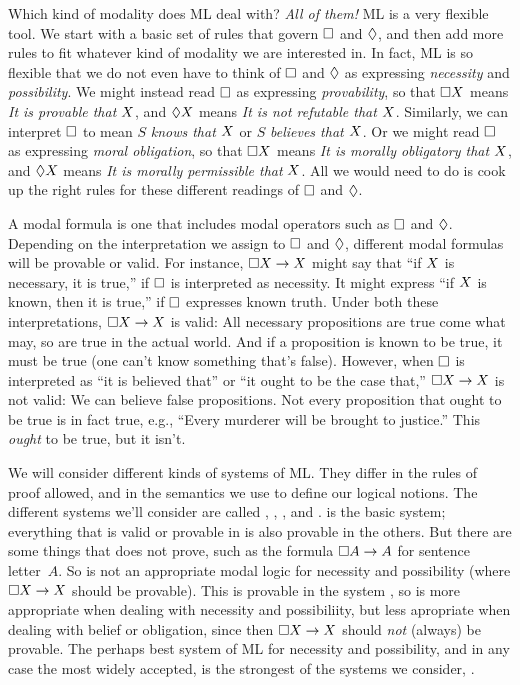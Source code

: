 Which kind of modality does ML deal with? \emph{All of them!} ML is a very flexible tool. We start with a basic set of rules that govern $\Box$ and $\Diamond$, and then add more rules to fit whatever kind of modality we are interested in. In fact, ML is so flexible that we do not even have to think of $\Box$ and $\Diamond$ as expressing \emph{necessity} and \emph{possibility}. We might instead read $\Box$ as expressing \emph{provability}, so that $\Box X$ means \emph{It is provable that} $X$, and $\Diamond X$ means \emph{It is not refutable that} $X$. Similarly, we can interpret $\Box$ to mean $S$ \emph{knows that $X$} or $S$ \emph{believes that $X$}. Or we might read $\Box$ as expressing \emph{moral obligation}, so that $\Box X$ means \emph{It is morally obligatory that} $X$, and $\Diamond X$ means \emph{It is morally permissible that} $X$. All we would need to do is cook up the right rules for these different readings of $\Box$ and $\Diamond$.

A modal formula is one that includes modal operators such as $\Box$ and $\Diamond$. Depending on the interpretation we assign to $\Box$ and $\Diamond$, different modal formulas will be provable or valid. For instance, $\Box X \rightarrow X$ might say that ``if $X$ is necessary, it is true,'' if $\Box$ is interpreted as necessity. It might express ``if $X$ is known, then it is true,'' if $\Box$ expresses known truth. Under both these interpretations, $\Box X \rightarrow X$ is valid: All necessary propositions are true come what may, so are true in the actual world. And if a proposition is known to be true, it must be true (one can't know something that's false). However, when $\Box$ is interpreted as ``it is believed that'' or ``it ought to be the case that,'' $\Box X \rightarrow X$ is not valid: We can believe false propositions. Not every proposition that ought to be true is in fact true, e.g., ``Every murderer will be brought to justice.'' This \emph{ought} to be true, but it isn't.

We will consider different kinds of systems of ML. They differ in the rules of proof allowed, and in the semantics we use to define our logical notions. The different systems we'll consider are called \mlK, \mlT, \mlSfour, and \mlSfive. \mlK{} is the basic system; everything that is valid or provable in \mlK{} is also provable in the others. But there are some things that \mlK{} does not prove, such as the formula $\Box A \rightarrow A$ for sentence letter~$A$. So \mlK{} is not an appropriate modal logic for necessity and possibility (where $\Box X \rightarrow X$ should be provable). This is provable in the system \mlT, so \mlT{} is more appropriate when dealing with necessity and possibiliity, but less apropriate when dealing with belief or obligation, since then $\Box X \rightarrow X$ should \emph{not} (always) be provable. The perhaps best system of ML for necessity and possibility, and in any case the most widely accepted, is the strongest of the systems we consider, \mlSfive.

